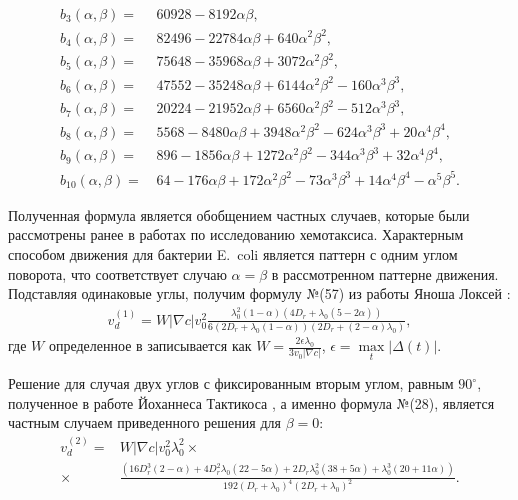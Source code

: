 \begin{equation}
\begin{aligned}
	b_3(\alpha, \beta) =&\, 60928 - 8192\alpha\beta, \\
	b_4(\alpha, \beta) =&\, 82496 - 22784\alpha\beta + 640\alpha^2\beta^2, \\
	b_5(\alpha, \beta) =&\, 75648 - 35968\alpha\beta + 3072\alpha^2\beta^2, \\
	b_6(\alpha, \beta) =&\, 47552 - 35248\alpha\beta + 6144\alpha^2\beta^2 - 160\alpha^3\beta^3, \\
	b_7(\alpha, \beta) =&\, 20224 - 21952\alpha\beta + 6560\alpha^2\beta^2 - 512\alpha^3\beta^3, \\
	b_8(\alpha, \beta) =&\, 5568 - 8480\alpha\beta + 3948\alpha^2\beta^2 - 624\alpha^3\beta^3 + 20\alpha^4\beta^4, \\
	b_9(\alpha, \beta) =&\, 896 - 1856\alpha\beta + 1272\alpha^2\beta^2 - 344\alpha^3\beta^3 + 32\alpha^4\beta^4, \\
	b_{10}(\alpha, \beta) =&\, 64 - 176\alpha\beta + 172\alpha^2\beta^2 - 73\alpha^3\beta^3 + 14\alpha^4\beta^4 - \alpha^5 \beta^5.
\end{aligned}
\end{equation}

Полученная формула является обобщением частных случаев, которые были рассмотрены ранее в работах по исследованию хемотаксиса. Характерным способом движения для бактерии E.~coli является паттерн с одним углом поворота, что соответствует случаю $\alpha=\beta$ в рассмотренном паттерне движения. Подставляя одинаковые углы, получим формулу №(57) из работы Яноша Локсей \cite{locsei_persistence_2007}:
\begin{equation}
    \begin{aligned}
        v_d^{(1)} = W|\nabla c|v_0^2\frac{\lambda_0^2(1-\alpha)\left (4D_r+\lambda_0(5-2\alpha) \right )}{6\left (2D_r+\lambda_0(1-\alpha) \right ) \left (2D_r+(2-\alpha)\lambda_0 \right )},
    \end{aligned}
\end{equation}
где $W$ определенное в \cite{locsei_persistence_2007} записывается как $W=\frac{2\epsilon\lambda_0}{3v_0|\nabla c|}$, $\epsilon=\max\limits_t|\Delta(t)|$.

Решение для случая двух углов с фиксированным вторым углом, равным $90^\circ$, полученное в работе Йоханнеса Тактикоса \cite{taktikos_how_2013}, а именно формула №(28), является частным случаем приведенного решения для $\beta=0$:
\begin{equation}
    \begin{aligned}
        v_d^{(2)} =& W |\nabla c| v_0^2 \lambda_0^2 \times \\
		\times& \frac{\left (16D_r^3(2-\alpha) + 4D_r^2\lambda_0(22-5\alpha) + 2D_r\lambda_0^2(38+5\alpha) + \lambda_0^3(20+11\alpha) \right )}{192(D_r+\lambda_0)^4(2D_r+\lambda_0)^2}.
    \end{aligned}
\end{equation}

